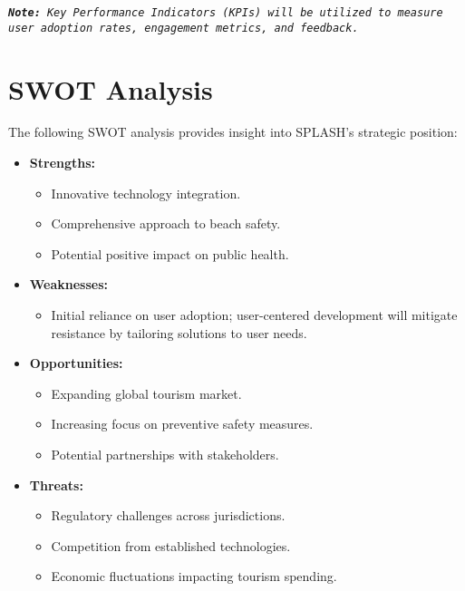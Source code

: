 \texttt{\textit{\textbf{Note:} Key Performance Indicators (KPIs) will be utilized to measure user adoption rates, engagement metrics, and feedback.}}

\section{SWOT Analysis}
The following SWOT analysis provides insight into SPLASH's strategic position:

\begin{itemize}
    \item \textbf{Strengths:}
        \begin{itemize}
            \item Innovative technology integration.
            \item Comprehensive approach to beach safety.
            \item Potential positive impact on public health.
        \end{itemize}

    \item \textbf{Weaknesses:}
        \begin{itemize}
            \item Initial reliance on user adoption; user-centered development will mitigate resistance by tailoring solutions to user needs.
        \end{itemize}

    \item \textbf{Opportunities:}
        \begin{itemize}
            \item Expanding global tourism market.
            \item Increasing focus on preventive safety measures.
            \item Potential partnerships with stakeholders.
        \end{itemize}

    \item \textbf{Threats:}
        \begin{itemize}
            \item Regulatory challenges across jurisdictions.
            \item Competition from established technologies.
            \item Economic fluctuations impacting tourism spending.
        \end{itemize}    
\end{itemize}
